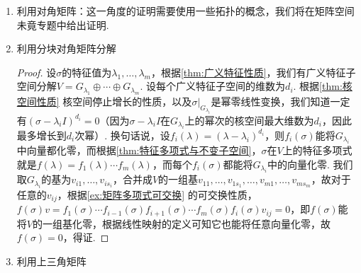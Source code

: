 \begin{enumerate}
    \item 利用对角矩阵：这一角度的证明需要使用一些拓扑的概念，我们将在矩阵空间未竟专题中给出证明.

    \item 利用分块对角矩阵分解

          \begin{proof}
              设$\sigma$的特征值为$\lambda_1,\ldots,\lambda_m$，根据\autoref{thm:广义特征性质}，我们有广义特征子空间分解$V=G_{\lambda_1}\oplus\cdots\oplus G_{\lambda_m}$. 设每个广义特征子空间的维数为$d_i$. 根据\autoref{thm:核空间性质} 核空间停止增长的性质，以及$\sigma\vert_{G_{\lambda_i}}$是幂零线性变换，我们知道一定有$(\sigma-\lambda_iI)^{d_i}=0$（因为$\sigma-\lambda_iI$在$G_{\lambda_i}$上的幂次的核空间最大维数为$d_i$，因此最多增长到$d_i$次幂）. 换句话说，设$f_i(\lambda)=(\lambda-\lambda_i)^{d_i}$，则$f_i(\sigma)$能将$G_{\lambda_i}$中向量都化零，而根据\autoref{thm:特征多项式与不变子空间}，$\sigma$在$V$上的特征多项式就是$f(\lambda)=f_1(\lambda)\cdots f_m(\lambda)$，而每个$f_i(\sigma)$都能将$G_{\lambda_i}$中的向量化零. 我们取$G_{\lambda_i}$的基为$v_{i1},\ldots,v_{is_i}$，合并成$V$的一组基$v_{11},\ldots,v_{1s_1},\ldots,v_{m1},\ldots,v_{ms_m}$，故对于任意的$v_{ij}$，根据\autoref{ex:矩阵多项式可交换} 的可交换性质，$f(\sigma)v=f_1(\sigma)\cdots f_{i-1}(\sigma)f_{i+1}(\sigma)\cdots f_m(\sigma)f_i(\sigma)v_{ij}=0$，即$f(\sigma)$能将$V$的一组基化零，根据线性映射的定义可知它也能将任意向量化零，故$f(\sigma)=0$，得证.
          \end{proof}

    \item 利用上三角矩阵


\end{enumerate}
